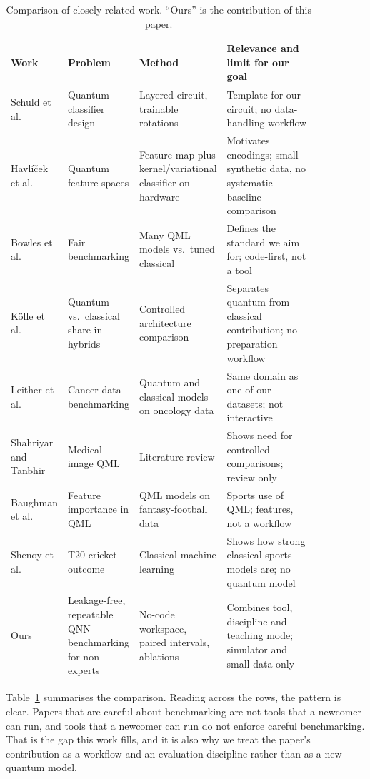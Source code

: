 \documentclass[conference]{IEEEtran}
\begin{document}
\begin{table}[!t]
\caption{Comparison of closely related work. ``Ours'' is the contribution of this paper.}
\label{tab:related}
\centering\footnotesize
\begin{tabular}{p{0.13\linewidth}p{0.19\linewidth}p{0.21\linewidth}p{0.32\linewidth}}
\toprule
Work & Problem & Method & Relevance and limit for our goal\\
\midrule
Schuld et al.~\cite{schuld2020circuit} & Quantum classifier design & Layered circuit, trainable rotations & Template for our circuit; no data-handling workflow\\
Havl\'i\v{c}ek et al.~\cite{havlicek2019supervised} & Quantum feature spaces & Feature map plus kernel/variational classifier on hardware & Motivates encodings; small synthetic data, no systematic baseline comparison\\
Bowles et al.~\cite{bowles2024better} & Fair benchmarking & Many QML models vs.\ tuned classical & Defines the standard we aim for; code-first, not a tool\\
K\"olle et al.~\cite{kolle2023disentangling} & Quantum vs.\ classical share in hybrids & Controlled architecture comparison & Separates quantum from classical contribution; no preparation workflow\\
Leither et al.~\cite{leither2026oncology} & Cancer data benchmarking & Quantum and classical models on oncology data & Same domain as one of our datasets; not interactive\\
Shahriyar and Tanbhir~\cite{shahriyar2025medical} & Medical image QML & Literature review & Shows need for controlled comparisons; review only\\
Baughman et al.~\cite{baughman2022feature} & Feature importance in QML & QML models on fantasy-football data & Sports use of QML; features, not a workflow\\
Shenoy et al.~\cite{shenoy2022t20} & T20 cricket outcome & Classical machine learning & Shows how strong classical sports models are; no quantum model\\
Ours & Leakage-free, repeatable QNN benchmarking for non-experts & No-code workspace, paired intervals, ablations & Combines tool, discipline and teaching mode; simulator and small data only\\
\bottomrule
\end{tabular}
\end{table}

Table~\ref{tab:related} summarises the comparison. Reading across the rows, the pattern is clear. Papers that are careful about benchmarking are not tools that a newcomer can run, and tools that a newcomer can run do not enforce careful benchmarking. That is the gap this work fills, and it is also why we treat the paper's contribution as a workflow and an evaluation discipline rather than as a new quantum model.
\end{document}
